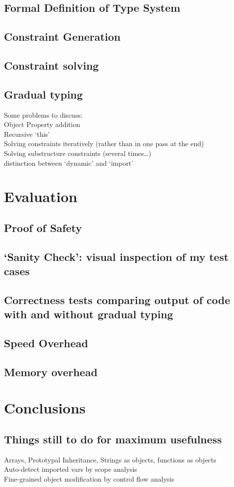 \documentclass{article}
\begin{document}
	
		\subsection{Formal Definition of Type System}
		\subsection{Constraint Generation}
		\subsection{Constraint solving}
		\subsection{Gradual typing}
		Some problems to discuss: \\
			Object Property addition \\
			Recursive `this' \\
			Solving constraints iteratively (rather than in one pass at the end) \\
			Solving substructure constraints (several times\ldots) \\
			distinction between `dynamic' and `import' \\
	\section{Evaluation}\label{evaluation}
		\subsection{Proof of Safety}
		\subsection{`Sanity Check': visual inspection of my test cases}
		\subsection{Correctness tests comparing output of code with and without gradual typing}
		\subsection{Speed Overhead}
		\subsection{Memory overhead}
	\section{Conclusions}
		\subsection{Things still to do for maximum usefulness}
			Arrays, Prototypal Inheritance, Strings as objects, functions as objects \\
			Auto-detect imported vars by scope analysis \\
			Fine-grained object modification by control flow analysis
\end{document}
